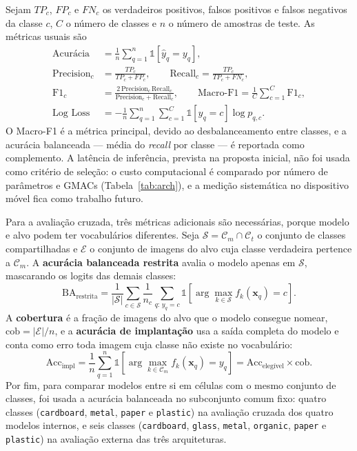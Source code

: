 \documentclass[11pt,a4paper]{article}
\begin{document}
	Sejam $TP_c$, $FP_c$ e $FN_c$ os verdadeiros positivos, falsos positivos e falsos negativos da classe $c$, $C$ o número de classes e $n$ o número de amostras de teste. As métricas usuais são
	\begin{align}
		\text{Acurácia} &= \frac{1}{n} \sum_{q=1}^{n} \mathbb{1}\left[\hat{y}_q = y_q\right], \\
		\text{Precision}_c &= \frac{TP_c}{TP_c + FP_c}, \qquad
		\text{Recall}_c = \frac{TP_c}{TP_c + FN_c}, \\
		\text{F1}_c &= \frac{2\,\text{Precision}_c\,\text{Recall}_c}{\text{Precision}_c + \text{Recall}_c}, \qquad
		\text{Macro-F1} = \frac{1}{C} \sum_{c=1}^{C} \text{F1}_c, \\
		\text{Log Loss} &= -\frac{1}{n} \sum_{q=1}^{n} \sum_{c=1}^{C} \mathbb{1}[y_q = c] \log p_{q,c}.
	\end{align}
	O Macro-F1 é a métrica principal, devido ao desbalanceamento entre classes, e a acurácia balanceada --- média do \emph{recall} por classe --- é reportada como complemento. A latência de inferência, prevista na proposta inicial, não foi usada como critério de seleção: o custo computacional é comparado por número de parâmetros e GMACs (Tabela~\ref{tab:arch}), e a medição sistemática no dispositivo móvel fica como trabalho futuro.
	
	Para a avaliação cruzada, três métricas adicionais são necessárias, porque modelo e alvo podem ter vocabulários diferentes. Seja $\mathcal{S} = \mathcal{C}_m \cap \mathcal{C}_t$ o conjunto de classes compartilhadas e $\mathcal{E}$ o conjunto de imagens do alvo cuja classe verdadeira pertence a $\mathcal{C}_m$. A \textbf{acurácia balanceada restrita} avalia o modelo apenas em $\mathcal{S}$, mascarando os logits das demais classes:
	\begin{equation}
		\text{BA}_{\text{restrita}} = \frac{1}{|\mathcal{S}|} \sum_{c \in \mathcal{S}} \frac{1}{n_c} \sum_{q:\, y_q = c} \mathbb{1}\!\left[\arg\max_{k \in \mathcal{S}} f_k(\mathbf{x}_q) = c\right].
		\label{eq:ba-restrita}
	\end{equation}
	A \textbf{cobertura} é a fração de imagens do alvo que o modelo consegue nomear, $\text{cob} = |\mathcal{E}|/n$, e a \textbf{acurácia de implantação} usa a saída completa do modelo e conta como erro toda imagem cuja classe não existe no vocabulário:
	\begin{equation}
		\text{Acc}_{\text{impl}} = \frac{1}{n} \sum_{q=1}^{n} \mathbb{1}\left[\arg\max_{k \in \mathcal{C}_m} f_k(\mathbf{x}_q) = y_q\right] = \text{Acc}_{\text{elegível}} \times \text{cob}.
		\label{eq:impl}
	\end{equation}
	Por fim, para comparar modelos entre si em células com o mesmo conjunto de classes, foi usada a acurácia balanceada no subconjunto comum fixo: quatro classes (\texttt{cardboard}, \texttt{metal}, \texttt{paper} e \texttt{plastic}) na avaliação cruzada dos quatro modelos internos, e seis classes (\texttt{cardboard}, \texttt{glass}, \texttt{metal}, \texttt{organic}, \texttt{paper} e \texttt{plastic}) na avaliação externa das três arquiteturas.
	
\end{document}
